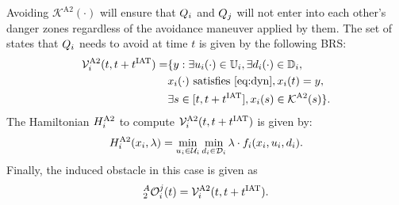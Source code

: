 \begin{itemize}[leftmargin=*]
Avoiding $\mathcal{K}^{\text{A2}}(\cdot)$ will ensure that $Q_i$ and $Q_j$ will not enter into each other's danger zones regardless of the avoidance maneuver applied by them. The set of states that $Q_i$ needs to avoid at time $t$ is given by the following BRS: 
\begin{equation} \label{eq:ObsBRS_case2_caseA}
\begin{aligned}
\brs^{\text{A2}}_{i}(t, t+\iat) = & \{y: \exists \ctrl_i(\cdot) \in \cfset_i, \exists \dstb_i(\cdot) \in \dfset_i, \\
& \state_i(\cdot) \text{ satisfies \eqref{eq:dyn}}, \state_i(t) = y, \\
& \exists s \in [t, t+\iat], \state_i(s) \in \mathcal{K}^{\text{A2}}(s) \}.
\end{aligned}
\end{equation}
The Hamiltonian $H^{\text{A2}}_{i}$ to compute $\mathcal{V}^{\text{A2}}_{i}(t, t+t^\text{IAT})$ is given by:
\begin{equation} \label{eqn:BRS_obsham_case2_caseA}
\ham^{\text{A2}}_{i}(\state_i, \costate) = \min_{\ctrl_i \in \cset_i} \min_{\dstb_i \in \dset_i} \costate \cdot f_i (\state_i, \ctrl_i, \dstb_i).
\end{equation}
Finally, the induced obstacle in this case is given as
\begin{equation} \label{eq:intruderObs_case2_caseA}
_2^A\ioset_i^j(t) = \brs^{\text{A2}}_{i}(t, t+\iat).
\end{equation}


\end{itemize}
